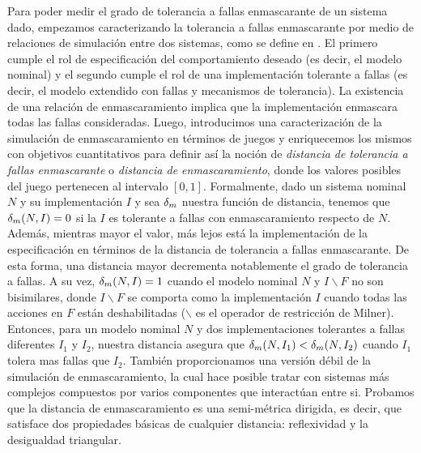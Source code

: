 Para poder medir el grado de tolerancia a fallas enmascarante de un sistema dado, empezamos caracterizando la tolerancia a fallas enmascarante por medio de relaciones de simulación entre dos sistemas, como se define en \cite{DemasiCMA17}. El primero cumple el rol de especificación del comportamiento deseado (es decir, el modelo nominal) y el segundo cumple el rol de una implementación tolerante a fallas (es decir, el modelo extendido con fallas y mecanismos de tolerancia).
La existencia de una relación de enmascaramiento implica que la implementación enmascara todas las fallas consideradas. Luego, introducimos una caracterización de la simulación de enmascaramiento en términos de juegos y enriquecemos los mismos con objetivos cuantitativos para definir así la noción de \emph{distancia de tolerancia a fallas enmascarante} o \emph{distancia de enmascaramiento}, donde los valores posibles del juego pertenecen al intervalo  $[0,1]$. 
Formalmente, dado un sistema nominal $N$ y su implementación $I$ y sea $\delta_{m}$ nuestra función de distancia, tenemos que $\delta_{m}(N,I)=0$ si la $I$ es tolerante a fallas con enmascaramiento respecto de $N$. Además, mientras mayor el valor, más lejos está la implementación de la especificación en términos de la distancia de tolerancia a fallas enmascarante. De esta forma, una distancia mayor decrementa notablemente el grado de tolerancia a fallas. A su vez, $\delta_{m}(N,I)=1$ cuando el modelo nominal $N$ y $I \backslash F$ no son bisimilares, donde $I\backslash F$ se comporta como la implementación $I$ cuando todas las acciones en $F$ están deshabilitadas ($\backslash$ es el operador de restricción de Milner).
Entonces, para un modelo nominal $N$ y dos implementaciones tolerantes a fallas diferentes $I_1$ y $I_2$, nuestra distancia asegura que  $\delta_{m}(N,I_1)<\delta_{m}(N,I_2)$ cuando $I_1$ tolera mas fallas que $I_2$.
También proporcionamos una versión débil de la simulación de enmascaramiento, la cual hace posible tratar con sistemas más complejos compuestos por varios componentes que interactúan entre si. Probamos que la distancia de enmascaramiento es una semi-métrica dirigida, es decir, que satisface dos propiedades básicas de cualquier distancia: reflexividad y la desigualdad triangular.

